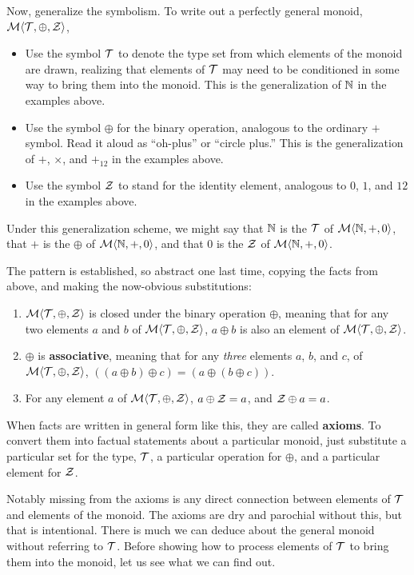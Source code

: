 Now, generalize the symbolism. To write out a perfectly general monoid, $\mathcal{M}\langle{\mathcal{T}},{\oplus},{\mathcal{Z}}\rangle$, 
\begin{itemize}
	\item Use the symbol $\mathcal{T}$ to denote the type set from which elements of the monoid are drawn, realizing that elements of $\mathcal{T}$ may need to be conditioned in some way to bring them into the monoid. This is the generalization of $\mathbb{N}$ in the examples above.
	\item Use the symbol $\oplus$ for the binary operation, analogous to the ordinary $+$ symbol. Read it aloud as ``oh-plus'' or ``circle plus.'' This is the generalization of $+$, $\times$, and $+_{12}$ in the examples above.
	\item Use the symbol $\mathcal{Z}$ to stand for the identity element, analogous to $0$, $1$, and $12$ in the examples above.
\end{itemize}


Under this generalization scheme, we might say that $\mathbb{N}$ is the $\mathcal{T}$ of $\mathcal{M}\langle{\mathbb{N}},{+},{0}\rangle$, that $+$ is the $\oplus$ of $\mathcal{M}\langle{\mathbb{N}},{+},{0}\rangle$, and that 0 is the $\mathcal{Z}$ of $\mathcal{M}\langle{\mathbb{N}},{+},{0}\rangle$. 


The pattern is established, so abstract one last time, copying the facts from above, and making the now-obvious substitutions:
\begin{enumerate}
  \item $\mathcal{M}\langle{\mathcal{T}},{\oplus},{\mathcal{Z}}\rangle$ is closed under the binary operation $\oplus$, meaning that for any two elements $a$ and $b$ of $\mathcal{M}\langle{\mathcal{T}},{\oplus},{\mathcal{Z}}\rangle$,  $a\oplus b$ is also an element of $\mathcal{M}\langle{\mathcal{T}},{\oplus},{\mathcal{Z}}\rangle$.
	\item $\oplus$ is \textbf{associative}, meaning that for any \emph{three} elements $a$, $b$, and $c$, of $\mathcal{M}\langle{\mathcal{T}},{\oplus},{\mathcal{Z}}\rangle$, $((a\oplus b)\oplus c)=(a\oplus (b\oplus c))$. 
	\item For any element $a$ of $\mathcal{M}\langle{\mathcal{T}},{\oplus},{\mathcal{Z}}\rangle$, $a\oplus\mathcal{Z}=a$, and $\mathcal{Z}\oplus a=a$.
\end{enumerate}


When facts are written in general form like this, they are called \textbf{axioms}. To convert them into factual statements about a particular monoid, just substitute a particular set for the type, $\mathcal{T}$, a particular operation for $\oplus$, and a particular element for $\mathcal{Z}$. 


Notably missing from the axioms is any direct connection between elements of $\mathcal{T}$ and elements of the monoid. The axioms are dry and parochial without this, but that is intentional. There is much we can deduce about the general monoid without referring to $\mathcal{T}$. Before showing how to process elements of $\mathcal{T}$ to bring them into the monoid, let us see what we can find out.


